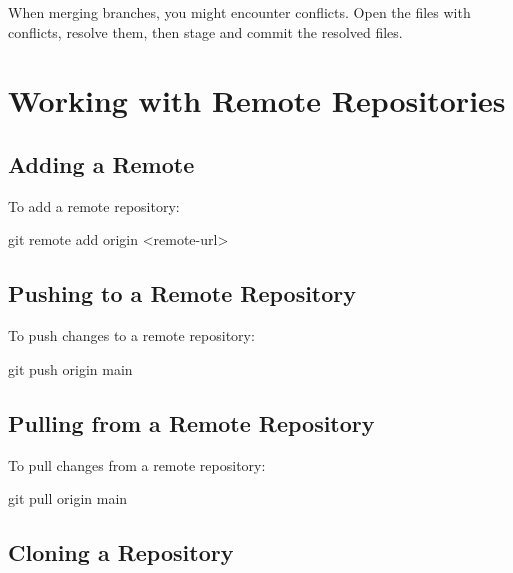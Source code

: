 \documentclass[
  letterpaper,
  DIV=11,
  numbers=noendperiod]{scrreprt}
\newenvironment{Shaded}{\begin{snugshade}}{\end{snugshade}}
\newcommand{\FunctionTok}[1]{\textcolor[rgb]{0.28,0.35,0.67}{#1}}
\newcommand{\NormalTok}[1]{\textcolor[rgb]{0.00,0.23,0.31}{#1}}
\newcommand{\OperatorTok}[1]{\textcolor[rgb]{0.37,0.37,0.37}{#1}}
\begin{document}
When merging branches, you might encounter conflicts. Open the files
with conflicts, resolve them, then stage and commit the resolved files.

\section{Working with Remote
Repositories}\label{working-with-remote-repositories}

\subsection{Adding a Remote}\label{adding-a-remote}

To add a remote repository:

\begin{Shaded}
\begin{Highlighting}[]
\FunctionTok{git}\NormalTok{ remote add origin }\OperatorTok{\textless{}}\NormalTok{remote{-}url}\OperatorTok{\textgreater{}}
\end{Highlighting}
\end{Shaded}

\subsection{Pushing to a Remote
Repository}\label{pushing-to-a-remote-repository}

To push changes to a remote repository:

\begin{Shaded}
\begin{Highlighting}[]
\FunctionTok{git}\NormalTok{ push origin main}
\end{Highlighting}
\end{Shaded}

\subsection{Pulling from a Remote
Repository}\label{pulling-from-a-remote-repository}

To pull changes from a remote repository:

\begin{Shaded}
\begin{Highlighting}[]
\FunctionTok{git}\NormalTok{ pull origin main}
\end{Highlighting}
\end{Shaded}

\subsection{Cloning a Repository}\label{cloning-a-repository-2}
\end{document}
